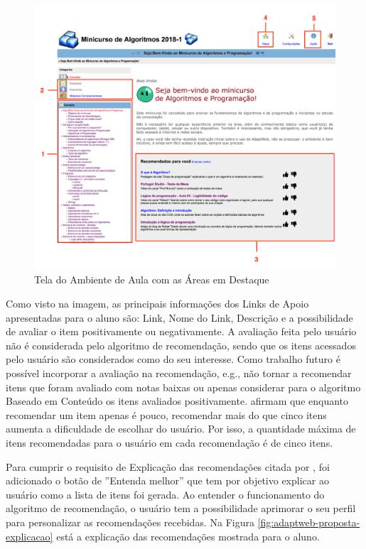 \begin{figure}[htb]
  \caption{\label{fig:adaptweb-proposta-recomendacao}Tela do Ambiente de Aula com as Áreas em Destaque}
  \begin{center}
      \includegraphics[scale=0.4]{./Figuras/interface-recomendacao.png}
  \end{center}
\end{figure}

Como visto na imagem, as principais informações dos Links de Apoio apresentadas para o aluno são: Link, Nome do Link,
Descrição e a possibilidade de avaliar o item positivamente ou negativamente. A avaliação feita pelo usuário não é
considerada pelo algoritmo de recomendação, sendo que os itens acessados pelo
usuário são considerados como do seu interesse. Como trabalho futuro é possível incorporar a avaliação na recomendação, e.g.,
não tornar a recomendar itens que foram avaliado com notas baixas ou apenas considerar para o algoritmo Baseado em Conteúdo
os itens avaliados positivamente.  afirmam que enquanto recomendar um item apenas é pouco, recomendar mais do que cinco itens
aumenta a dificuldade de escolhar do usuário. Por isso, a quantidade máxima de itens recomendadas para o usuário em cada
recomendação é de cinco itens.

Para cumprir o requisito de Explicação das recomendações citada por , foi adicionado o
botão de ''Entenda melhor'' que tem por objetivo explicar ao usuário como a lista de itens foi gerada. Ao entender o
funcionamento do algoritmo de recomendação, o usuário tem a possibilidade aprimorar o seu perfil para personalizar as
recomendações recebidas. Na Figura \ref{fig:adaptweb-proposta-explicacao} está a explicação das recomendações
mostrada para o aluno.

